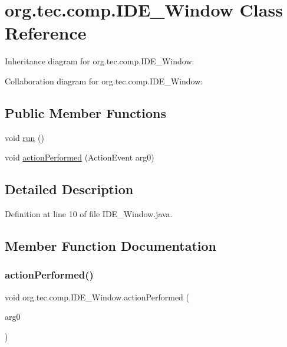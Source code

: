 \hypertarget{classorg_1_1tec_1_1comp_1_1_i_d_e___window}{}\section{org.\+tec.\+comp.\+I\+D\+E\+\_\+\+Window Class Reference}
\label{classorg_1_1tec_1_1comp_1_1_i_d_e___window}


Inheritance diagram for org.\+tec.\+comp.\+I\+D\+E\+\_\+\+Window\+:


Collaboration diagram for org.\+tec.\+comp.\+I\+D\+E\+\_\+\+Window\+:
\subsection*{Public Member Functions}
\begin{DoxyCompactItemize}
\item 
void \mbox{\hyperlink{classorg_1_1tec_1_1comp_1_1_i_d_e___window_a3ca2320d568f3bf02446fea735ba322e}{run}} ()
\item 
void \mbox{\hyperlink{classorg_1_1tec_1_1comp_1_1_i_d_e___window_a0cd397859b400a51e4f76c967ffa2534}{action\+Performed}} (Action\+Event arg0)
\end{DoxyCompactItemize}


\subsection{Detailed Description}


Definition at line 10 of file I\+D\+E\+\_\+\+Window.\+java.



\subsection{Member Function Documentation}
\mbox{\label{classorg_1_1tec_1_1comp_1_1_i_d_e___window_a0cd397859b400a51e4f76c967ffa2534}} 
\subsubsection{\texorpdfstring{action\+Performed()}{actionPerformed()}}
{\footnotesize\ttfamily void org.\+tec.\+comp.\+I\+D\+E\+\_\+\+Window.\+action\+Performed (\begin{DoxyParamCaption}\item[{Action\+Event}]{arg0 }\end{DoxyParamCaption})\hspace{0.3cm}{\ttfamily [inline]}}



